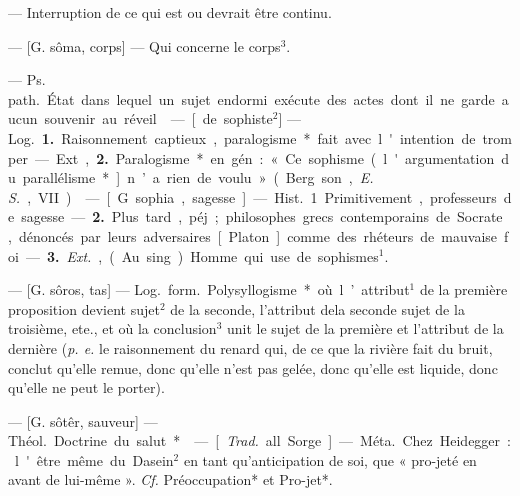 \begin{itemize}[leftmargin=1cm, label=, itemsep=1pt]
 — Interruption
de ce qui est ou devrait être continu.

 — [G. sôma, corps] — Qui
concerne le corps$^3$.

 — \si{Ps. path.} État
dans lequel un sujet endormi exécute
des actes dont il ne garde aucun souvenir au réveil.

 — [de sophiste$^2$] — \si{Log.} {\bf 1.} Raisonnement captieux, paralogisme*
fait avec l'intention de tromper. —
Ext, {\bf 2.} Paralogisme* en gén. : « Ce
sophisme (l'argumentation du parallélisme*] n’a rien de voulu » (Berg
son, {\it E. S.}, VII).

 — [G. sophia, sagesse] — \si{Hist.}
1. Primitivement, professeurs de
sagesse. — {\bf 2.} Plus tard., péj. ; philosophes grecs contemporains de
Socrate, dénoncés par leurs adversaires [Platon] comme des rhéteurs
de mauvaise foi. — {\bf 3.} {\it Ext.}, (Au
sing.) Homme qui use de sophismes$^1$.

 — [G. sôros, tas] — \si{Log.} \si{form.}
Polysyllogisme* où l’attribut$^1$ de la
première proposition devient sujet$^2$
de la seconde, l’attribut dela seconde
sujet de la troisième, ete., et où la
conclusion$^3$ unit le sujet de la première et l’attribut de la dernière ({\it p. e.}
le raisonnement du renard qui, de
ce que la rivière fait du bruit, conclut qu’elle remue, donc qu’elle n’est
pas gelée, donc qu’elle est liquide,
donc qu'elle ne peut le porter).

 — [G. sôtêr, sauveur] —
\si{Théol.} Doctrine du salut*.

 — [{\it Trad.} all. Sorge] — \si{Méta.} Chez
Heidegger : l'être même du Dasein$^2$
en tant qu’anticipation de soi, que
« pro-jeté en avant de lui-même ».
{\it Cf.} Préoccupation* et Pro-jet*.


\end{itemize}
